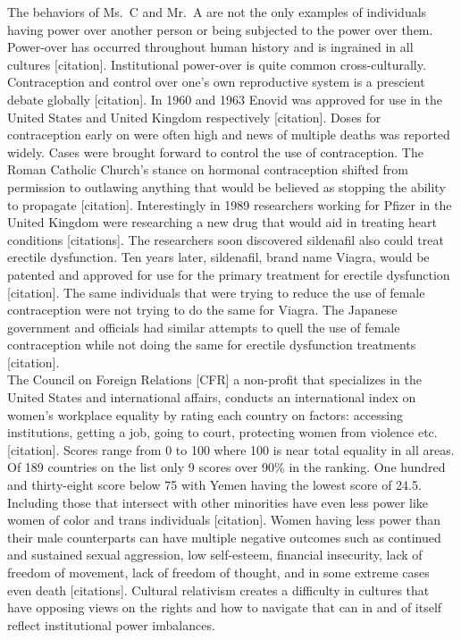 \documentclass[
  donotrepeattitle,doc, 12pt, a4paper,floatsintext]{apa7}
\begin{document}
The behaviors of Ms.~C and Mr.~A are not the only examples of individuals having power over another person or being subjected to the power over them. Power-over has occurred throughout human history and is ingrained in all cultures {[}citation{]}. Institutional power-over is quite common cross-culturally. Contraception and control over one's own reproductive system is a prescient debate globally {[}citation{]}. In 1960 and 1963 Enovid was approved for use in the United States and United Kingdom respectively {[}citation{]}. Doses for contraception early on were often high and news of multiple deaths was reported widely. Cases were brought forward to control the use of contraception. The Roman Catholic Church's stance on hormonal contraception shifted from permission to outlawing anything that would be believed as stopping the ability to propagate {[}citation{]}. Interestingly in 1989 researchers working for Pfizer in the United Kingdom were researching a new drug that would aid in treating heart conditions {[}citations{]}. The researchers soon discovered sildenafil also could treat erectile dysfunction. Ten years later, sildenafil, brand name Viagra, would be patented and approved for use for the primary treatment for erectile dysfunction {[}citation{]}. The same individuals that were trying to reduce the use of female contraception were not trying to do the same for Viagra. The Japanese government and officials had similar attempts to quell the use of female contraception while not doing the same for erectile dysfunction treatments {[}citation{]}.\\
The Council on Foreign Relations {[}CFR{]} a non-profit that specializes in the United States and international affairs, conducts an international index on women's workplace equality by rating each country on factors: accessing institutions, getting a job, going to court, protecting women from violence etc. {[}citation{]}. Scores range from 0 to 100 where 100 is near total equality in all areas. Of 189 countries on the list only 9 scores over 90\% in the ranking. One hundred and thirty-eight score below 75 with Yemen having the lowest score of 24.5. Including those that intersect with other minorities have even less power like women of color and trans individuals {[}citation{]}. Women having less power than their male counterparts can have multiple negative outcomes such as continued and sustained sexual aggression, low self-esteem, financial insecurity, lack of freedom of movement, lack of freedom of thought, and in some extreme cases even death {[}citations{]}. Cultural relativism creates a difficulty in cultures that have opposing views on the rights and how to navigate that can in and of itself reflect institutional power imbalances.
\end{document}
